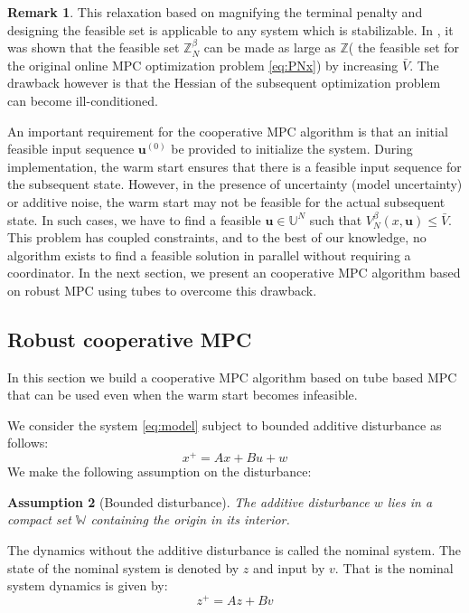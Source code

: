 \documentclass[10pt]{article}
\newcommand{\bu}{\mathbf{u}}
\newtheorem{assumption}{Assumption}
\theoremstyle{definition}
\newtheorem{remark}[assumption]{Remark}
\begin{document}
\begin{remark}
This relaxation based on magnifying the terminal penalty and designing the feasible set is applicable to any system which is stabilizable. In \citet{pannocchia:rawlings:wright:2011}, it was shown that the feasible set $\mathbb{Z}_N^\beta$  can be made as large as $\mathbb{Z}$( the feasible set for the original online MPC optimization problem \eqref{eq:PNx}) by increasing $\bar{V}$. The drawback however is that the Hessian of the subsequent optimization problem can become ill-conditioned.

An important requirement for the cooperative MPC algorithm is that an initial feasible input sequence $\bu^{(0)}$ be provided to initialize the system.  During implementation, the warm start ensures that there is a feasible input sequence for the subsequent state. However, in the presence of uncertainty (model uncertainty) or additive noise, the warm start may not be feasible for the actual subsequent state. In such cases, we have to find a feasible $\bu \in \mathbb{U}^N$ such that $V_N^\beta(x,\bu) \leq \bar{V}$. This problem has coupled constraints, and to the best of our knowledge, no algorithm exists to find a feasible solution in parallel without requiring a coordinator. In the next section, we present an cooperative MPC algorithm based on robust MPC using tubes to overcome this drawback.
\end{remark}


\subsection{Robust cooperative MPC}
\label{sec:tube}
In this section we build a cooperative MPC algorithm based on tube based MPC \cite{langson:chryssochoos:rakovic:mayne:2004} that can be used even when the warm start becomes infeasible.

We consider the system \eqref{eq:model} subject to bounded additive
disturbance as follows:
\begin{equation}
\label{eq:model_dist}
x^+ = Ax +  B u + w
\end{equation}
We make the following assumption on the disturbance:
\begin{assumption}[Bounded disturbance]
\label{ass:W}
The additive disturbance $w$ lies in a compact set $\mathbb{W}$
containing the origin in its interior.
\end{assumption}

The dynamics without the additive disturbance is called the nominal system. The state of the nominal system is denoted by $z$ and input by $v$. That is the nominal system dynamics is given by:
\begin{equation}
\label{eq:model_nominal}
z^+ = Az + B v
\end{equation}
\end{document}
